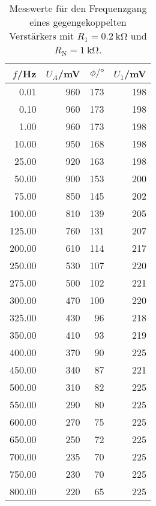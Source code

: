 \begin{table}
  \centering
\begin{tabular}{rrrr}
     $f$/Hz &  $U_A$/mV &  $\phi/\si{\degree}$ &  $U_1$/mV \\
\midrule
   0.01 &  960 &  173 &  198 \\
   0.10 &  960 &  173 &  198 \\
   1.00 &  960 &  173 &  198 \\
  10.00 &  950 &  168 &  198 \\
  25.00 &  920 &  163 &  198 \\
  50.00 &  900 &  153 &  200 \\
  75.00 &  850 &  145 &  202 \\
 100.00 &  810 &  139 &  205 \\
 125.00 &  760 &  131 &  207 \\
 200.00 &  610 &  114 &  217 \\
 250.00 &  530 &  107 &  220 \\
 275.00 &  500 &  102 &  221 \\
 300.00 &  470 &  100 &  220 \\
 325.00 &  430 &   96 &  218 \\
 350.00 &  410 &   93 &  219 \\
 400.00 &  370 &   90 &  225 \\
 450.00 &  340 &   87 &  221 \\
 500.00 &  310 &   82 &  225 \\
 550.00 &  290 &   80 &  225 \\
 600.00 &  270 &   75 &  225 \\
 650.00 &  250 &   72 &  225 \\
 700.00 &  235 &   70 &  225 \\
 750.00 &  230 &   70 &  225 \\
 800.00 &  220 &   65 &  225 \\
\end{tabular}
\caption{Messwerte für den Frequenzgang eines gegengekoppelten Verstärkers mit $R_1 = \SI{0.2}{\kilo\ohm}$ und $R_\text{N} = \SI{1}{\kilo\ohm}$.}
\end{table}
